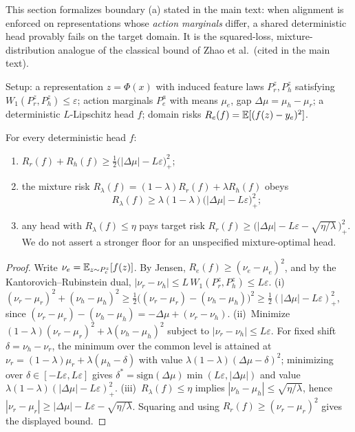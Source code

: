 This section formalizes boundary (a) stated in the main text: when alignment is enforced on representations whose \emph{action marginals} differ, a shared deterministic head provably fails on the target domain.
It is the squared-loss, mixture-distribution analogue of the classical bound of Zhao et al.\ (cited in the main text).

Setup: a representation $z = \Phi(x)$ with induced feature laws $P_r^z, P_h^z$ satisfying $W_1(P_r^z, P_h^z) \le \varepsilon$; action marginals $P_e^a$ with means $\mu_e$, gap $\Delta\mu = \mu_h - \mu_r$; a deterministic $L$-Lipschitz head $f$; domain risks $R_e(f) = \mathbb{E}[(f(z) - y_e)^2]$.

\begin{proposition}\label{supp:prop:zhao}
For every deterministic head $f$:
\begin{enumerate}
\item[(i)] $R_r(f) + R_h(f) \ge \tfrac12\big(|\Delta\mu| - L\varepsilon\big)_+^2$;
\item[(ii)] the mixture risk $R_\lambda(f) = (1-\lambda)R_r(f) + \lambda R_h(f)$ obeys
\begin{equation}
R_\lambda(f) \ge \lambda(1-\lambda)\big(|\Delta\mu| - L\varepsilon\big)_+^2;
\end{equation}
\item[(iii)] any head with $R_\lambda(f) \le \eta$ pays target risk
$R_r(f) \ge \big(|\Delta\mu| - L\varepsilon - \sqrt{\eta/\lambda}\,\big)_+^2$. We do not assert a stronger floor for an unspecified mixture-optimal head.
\end{enumerate}
\end{proposition}

\begin{proof}
Write $\nu_e = \mathbb{E}_{z \sim P_e^z}[f(z)]$.
By Jensen, $R_e(f) \ge (\nu_e - \mu_e)^2$, and by the Kantorovich--Rubinstein dual, $|\nu_r - \nu_h| \le L\, W_1(P_r^z, P_h^z) \le L\varepsilon$.
(i)~$(\nu_r-\mu_r)^2 + (\nu_h-\mu_h)^2 \ge \tfrac12\big((\nu_r-\mu_r) - (\nu_h-\mu_h)\big)^2 \ge \tfrac12(|\Delta\mu| - L\varepsilon)_+^2$, since $(\nu_r-\mu_r) - (\nu_h-\mu_h) = -\Delta\mu + (\nu_r - \nu_h)$.
(ii)~Minimize $(1-\lambda)(\nu_r-\mu_r)^2 + \lambda(\nu_h-\mu_h)^2$ subject to $|\nu_r-\nu_h| \le L\varepsilon$. For fixed shift $\delta = \nu_h - \nu_r$, the minimum over the common level is attained at $\nu_r = (1-\lambda)\mu_r + \lambda(\mu_h - \delta)$ with value $\lambda(1-\lambda)(\Delta\mu - \delta)^2$; minimizing over $\delta \in [-L\varepsilon, L\varepsilon]$ gives $\delta^* = \mathrm{sign}(\Delta\mu)\min(L\varepsilon, |\Delta\mu|)$ and value $\lambda(1-\lambda)(|\Delta\mu| - L\varepsilon)_+^2$.
(iii)~$R_\lambda(f) \le \eta$ implies $|\nu_h - \mu_h| \le \sqrt{\eta/\lambda}$, hence $|\nu_r - \mu_r| \ge |\Delta\mu| - L\varepsilon - \sqrt{\eta/\lambda}$. Squaring and using $R_r(f) \ge (\nu_r - \mu_r)^2$ gives the displayed bound.
\end{proof}

